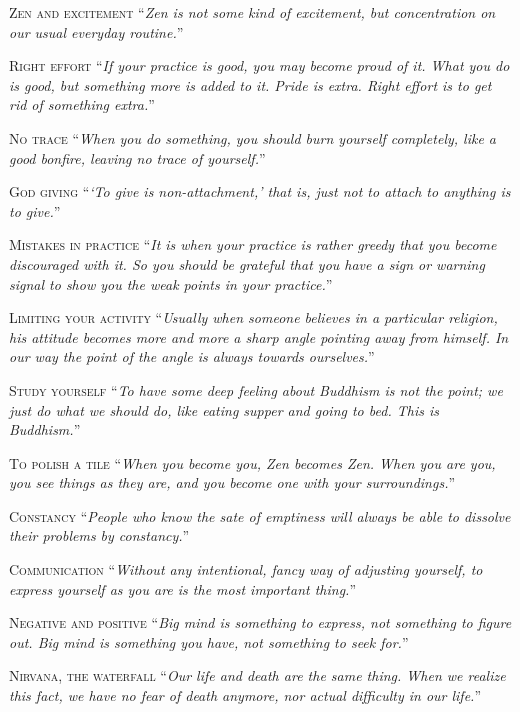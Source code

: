 \documentclass[14pt]{extarticle}
\newcommand{\aphor}[2]{
    \lettrine[lines=2, lraise=0.15]{#1}{#2}
}
\begin{document}
\aphor{Z}{en and excitement} \enquote{\textit{Zen is not some kind of excitement, but concentration on our usual everyday routine.}}

\aphor{R}{ight effort} \enquote{\textit{If your practice is good, you may become proud of it. What you do is good, but something more is added to it. Pride is extra. Right effort is to get rid of something extra.}}

\aphor{N}{o trace} \enquote{\textit{When you do something, you should burn yourself completely, like a good bonfire, leaving no trace of yourself.}}

\aphor{G}{od giving} \enquote{\textit{\enquote{To give is non-attachment,} that is, just not to attach to anything is to give.}}

\aphor{M}{istakes in practice} \enquote{\textit{It is when your practice is rather greedy that you become discouraged with it. So you should be grateful that you have a sign or warning signal to show you the weak points in your practice.}}

\aphor{L}{imiting your activity} \enquote{\textit{Usually when someone believes in a particular religion, his attitude becomes more and more a sharp angle pointing away from himself. In our way the point of the angle is always towards ourselves.}}

\pagebreak

\aphor{S}{tudy yourself} \enquote{\textit{To have some deep feeling about Buddhism is not the point; we just do what we should do, like eating supper and going to bed. This is Buddhism.}}


\aphor{T}{o polish a tile} \enquote{\textit{When you become you, Zen becomes Zen. When you are you, you see things as they are, and you become one with your surroundings.}}

\aphor{C}{onstancy} \enquote{\textit{People who know the sate of emptiness will always be able to dissolve their problems by constancy.}}

\aphor{C}{ommunication} \enquote{\textit{Without any intentional, fancy way of adjusting yourself, to express yourself as you are is the most important thing.}}

\aphor{N}{egative and positive} \enquote{\textit{Big mind is something to express, not something to figure out. Big mind is something you have, not something to seek for.}}

\aphor{N}{irvana, the waterfall} \enquote{\textit{Our life and death are the same thing. When we realize this fact, we have no fear of death anymore, nor actual difficulty in our life.}}
\end{document}
